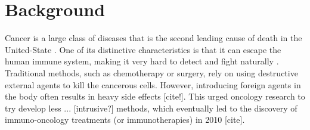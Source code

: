 \documentclass[11pt]{article}
\begin{document}
\section{Background}\label{sec:background}

\iffalse %
Plan:
I - Introduce state of therapies, unmet needs, ie explain why the project makes sense in the pharma industry
II - Introduce in more details result of Jun Ishihara on the CBD-IL-12 specifically
III - Explain why computational modelling approach make sense (cite similar analysis for example).
IV - Justify the methodology I suppose? So cite Bayesian Workflow from Gelman. Also justify why sens. analysis makes sense to reduce dimensionality, etc. Maybe mention that obj. 1 and 2 are concurrent, meaning that I have to work on them at the same time.
V - ?? This should be enough
\fi

\quad Cancer is a large class of diseases that is the second leading cause of death in the United-State \cite{nchs}. One of its distinctive characteristics is that it can escape the human immune system, making it very hard to detect and fight naturally \cite{EvasionMech}. Traditional methods, such as chemotherapy or surgery, rely on using destructive external agents to kill the cancerous cells. However, introducing foreign agents in the body often results in heavy side effects [cite!]. This urged oncology research to try develop less ... [intrusive?] methods, which eventually led to the discovery of immuno-oncology treatments (or immunotherapies) in 2010 [cite]. 
\end{document}
